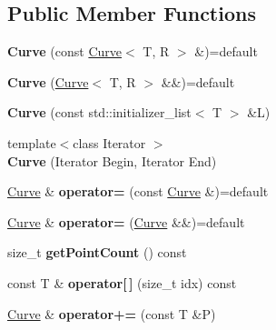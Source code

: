 \subsection*{Public Member Functions}
\begin{DoxyCompactItemize}
\item 
\hypertarget{class_curve_acf1a8243f5866354dc219de4e46812f1}{{\bfseries Curve} (const \hyperlink{class_curve}{Curve}$<$ T, R $>$ \&)=default}\label{class_curve_acf1a8243f5866354dc219de4e46812f1}

\item 
\hypertarget{class_curve_aad4e437b4852e30ff80795bc26bf6acc}{{\bfseries Curve} (\hyperlink{class_curve}{Curve}$<$ T, R $>$ \&\&)=default}\label{class_curve_aad4e437b4852e30ff80795bc26bf6acc}

\item 
\hypertarget{class_curve_ac44599de71da0036206bc3c394718982}{{\bfseries Curve} (const std\+::initializer\+\_\+list$<$ T $>$ \&L)}\label{class_curve_ac44599de71da0036206bc3c394718982}

\item 
\hypertarget{class_curve_a12df06dd0d0bd6057df64ab7adcf7f87}{{\footnotesize template$<$class Iterator $>$ }\\{\bfseries Curve} (Iterator Begin, Iterator End)}\label{class_curve_a12df06dd0d0bd6057df64ab7adcf7f87}

\item 
\hypertarget{class_curve_a1f5d904ae8065ce84bed3b35a6c986fc}{\hyperlink{class_curve}{Curve} \& {\bfseries operator=} (const \hyperlink{class_curve}{Curve} \&)=default}\label{class_curve_a1f5d904ae8065ce84bed3b35a6c986fc}

\item 
\hypertarget{class_curve_a3513c7344f57c252d4e26d08d5443065}{\hyperlink{class_curve}{Curve} \& {\bfseries operator=} (\hyperlink{class_curve}{Curve} \&\&)=default}\label{class_curve_a3513c7344f57c252d4e26d08d5443065}

\item 
\hypertarget{class_curve_a3f1470b2c32786ee3377890c96d0aa26}{size\+\_\+t {\bfseries get\+Point\+Count} () const }\label{class_curve_a3f1470b2c32786ee3377890c96d0aa26}

\item 
\hypertarget{class_curve_a2c34dfe2f8ee8a81b6fa7321600f12ba}{const T \& {\bfseries operator\mbox{[}$\,$\mbox{]}} (size\+\_\+t idx) const }\label{class_curve_a2c34dfe2f8ee8a81b6fa7321600f12ba}

\item 
\hypertarget{class_curve_ac090e6c8c54c80d4488a6dca7137a53f}{\hyperlink{class_curve}{Curve} \& {\bfseries operator+=} (const T \&P)}\label{class_curve_ac090e6c8c54c80d4488a6dca7137a53f}


\end{DoxyCompactItemize}
